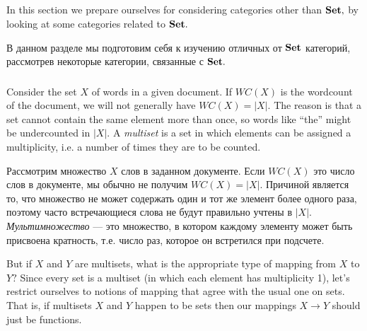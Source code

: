 \documentclass[CT4S-EN-RU]{subfiles}
\begin{document}

\subsection{}

\begin{blockENG}
In this section we prepare ourselves for considering categories other than ${\mathbf{Set}},$ by looking at some categories related to ${\mathbf{Set}}.$ 
\end{blockENG}

\begin{blockRUS}
В данном разделе мы подготовим себя к изучению отличных от ${\mathbf{Set}}$ категорий, рассмотрев некоторые категории, связанные с ${\mathbf{Set}}.$ 
\end{blockRUS}


\subsubsection{}

\begin{blockENG}
Consider the set $X$ of words in a given document. If $WC(X)$ is the wordcount of the document, we will not generally have $WC(X)=|X|.$ The reason is that a set cannot contain the same element more than once, so words like “the” might be undercounted in $|X|.$ A {\em multiset} is a set in which elements can be assigned a multiplicity, i.e. a number of times they are to be counted. 
\end{blockENG}

\begin{blockRUS}
Рассмотрим множество $X$ слов в заданном документе. Если $WC(X)$ это число слов в документе, мы обычно не получим $WC(X)=|X|.$ Причиной является то, что множество не может содержать один и тот же элемент более одного раза, поэтому часто встречающиеся слова не будут правильно учтены в $|X|.$ {\em Мультимножество} — это множество, в котором каждому элементу может быть присвоена кратность, т.е. число раз, которое он встретился при подсчете. 
\end{blockRUS}

\begin{blockENG}
But if $X$ and $Y$ are multisets, what is the appropriate type of mapping from $X$ to $Y?$ Since every set is a multiset (in which each element has multiplicity 1), let's restrict ourselves to notions of mapping that agree with the usual one on sets. That is, if multisets $X$ and $Y$ happen to be sets then our mappings $X\to Y$ should just be functions.
\end{blockENG}
\end{document}
